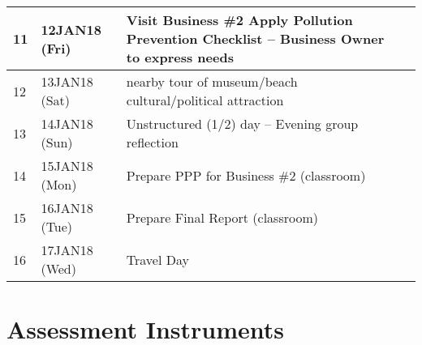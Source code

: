 \documentclass[12pt]{article}
\begin{document}
\begin{longtable}{p{0.2in}p{1.2in}p{3.7in}p{1.0in}}
11 & 12JAN18 (Fri) & Visit Business \#2  Apply Pollution Prevention Checklist -- Business Owner to express needs  &  \\
\hline
12 & 13JAN18 (Sat) &  nearby tour of museum/beach cultural/political attraction &  \\
13 & 14JAN18 (Sun) & Unstructured (1/2) day -- Evening group reflection &  \\
\hline
14 & 15JAN18 (Mon) & Prepare PPP for Business \#2 (classroom)  &   \\
15 & 16JAN18 (Tue) & Prepare Final Report (classroom) &  \\
16 & 17JAN18 (Wed) & Travel Day &  \\
\hline
\hline
\end{longtable}
\normalsize

%
\clearpage
\section*{Assessment Instruments}
\end{document}
